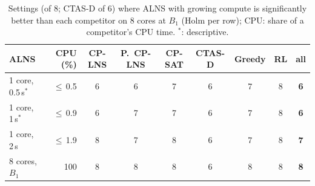 \begin{table}[t]
\centering
\footnotesize
\setlength{\tabcolsep}{2.6pt}
\caption{Settings (of 8; CTAS-D of 6) where ALNS with growing compute is significantly better than each competitor on 8 cores at $B_1$ (Holm per row); CPU: share of a competitor's CPU time. $^*$: descriptive.}
\label{tab:progress}
\begin{tabular}{@{}lrccccccc@{}}
\toprule
ALNS & CPU (\%) & CP-LNS & P.\ CP-LNS & CP-SAT & CTAS-D & Greedy & RL & all \\
\midrule
1 core, 0.5\,s$^*$ & $\le$\,0.5 & 6 & 6 & 7 & 6 & 7 & 8 & \textbf{6} \\
1 core, 1\,s$^*$ & $\le$\,0.9 & 6 & 7 & 7 & 6 & 7 & 8 & \textbf{6} \\
1 core, 2\,s & $\le$\,1.9 & 8 & 7 & 8 & 6 & 7 & 8 & \textbf{7} \\
8 cores, $B_1$ & 100 & 8 & 8 & 8 & 6 & 8 & 8 & \textbf{8} \\
\bottomrule
\end{tabular}
\end{table}
